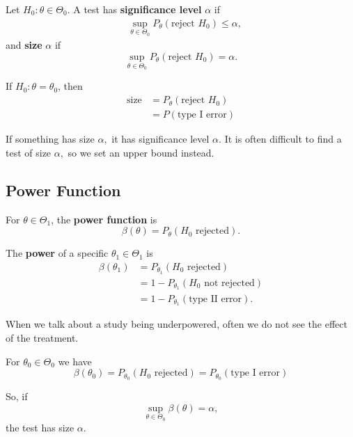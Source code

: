 \begin{definition}
Let $H_0: \theta\in \Theta_0$. A test has \textbf{significance level} $\alpha$ if
\begin{align*}
    &\sup_{\theta\in \Theta_0} P_\theta(\text{reject }H_0) \leq \alpha,
\end{align*}
and \textbf{size} $\alpha$ if
$$
\sup_{\theta\in \Theta_0} P_\theta(\text{reject }H_0)=\alpha.
$$
\end{definition}
If $H_0:\theta=\theta_0$, then 
\begin{align*}
    \text{size}&=P_\theta(\text{reject } H_0) \\
    &=P(\text{type I error})
\end{align*}

If something has size $\alpha,$ it has significance level $\alpha.$ It is often difficult to find a test of size $\alpha,$ so we set an upper bound instead.

\subsection{Power Function}

\begin{definition}
For $\theta\in \Theta_1$, the \textbf{power function} is
$$
\beta(\theta)=P_\theta(H_0 \text{ rejected}).
$$
\end{definition}

\begin{definition}
The \textbf{power} of a specific $\theta_1\in \Theta_1$ is 
\begin{align*}
\beta(\theta_1)&=P_{\theta_1}(H_0\text{ rejected}) \\
&=1-P_{\theta_1}(H_0 \text{ not rejected}) \\
&=1-P_{\theta_1}(\text{type II error}).
 \end{align*}
\end{definition}

When we talk about a study being underpowered, often we do not see the effect of the treatment.

For $\theta_0\in \Theta_0$ we have
$$
\beta(\theta_0)=P_{\theta_0}(H_0 \text{ rejected})=P_{\theta_0}(\text{type I error})
$$

So, if 
$$
\sup_{\theta\in \Theta_0}\beta(\theta)=\alpha,$$
the test has size $\alpha$.

